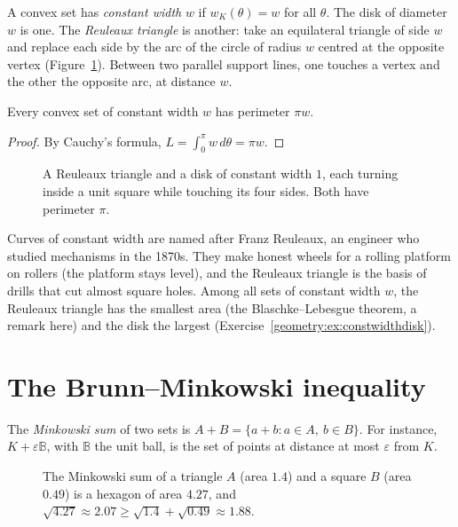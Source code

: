 A convex set has \emph{constant width} $w$ if $w_K(\theta)=w$ for all $\theta$. The disk of diameter $w$ is one. The \emph{Reuleaux triangle} is another:
take an equilateral triangle of side $w$ and replace each side by the arc of the circle of radius $w$ centred at the opposite vertex (Figure~\ref{geometry:fig:reuleaux}).
Between two parallel support lines, one touches a vertex and the other the opposite arc, at distance $w$.

\begin{corollary}[Barbier, 1860]\label{geometry:cor:barbier}
Every convex set of constant width $w$ has perimeter $\pi w$.
\end{corollary}

\begin{proof}
By Cauchy's formula, $L=\int_0^\pi w\,d\theta=\pi w$.
\end{proof}

\begin{figure}[ht]
\centering
{}
\caption{A Reuleaux triangle and a disk of constant width $1$, each turning inside a unit square while touching its four sides. Both have perimeter $\pi$.}
\label{geometry:fig:reuleaux}
\end{figure}

Curves of constant width are named after Franz Reuleaux, an engineer who studied mechanisms in the 1870s. They make honest wheels for a rolling platform on
rollers (the platform stays level), and the Reuleaux triangle is the basis of drills that cut almost square holes. Among all sets of constant width $w$, the
Reuleaux triangle has the smallest area (the Blaschke--Lebesgue theorem, a remark here) and the disk the largest (Exercise~\ref{geometry:ex:constwidthdisk}).

\section{The Brunn--Minkowski inequality}

The \emph{Minkowski sum} of two sets is $A+B=\{a+b:a\in A,\ b\in B\}$. For instance, $K+\varepsilon\mathbb B$, with $\mathbb B$ the unit ball, is the set of
points at distance at most $\varepsilon$ from $K$.

\begin{figure}[ht]
\centering
{}
\caption{The Minkowski sum of a triangle $A$ (area $1.4$) and a square $B$ (area $0.49$) is a hexagon of area $4.27$, and
$\sqrt{4.27}\approx2.07\ge\sqrt{1.4}+\sqrt{0.49}\approx1.88$.}
\label{geometry:fig:minkowskisum}
\end{figure}

